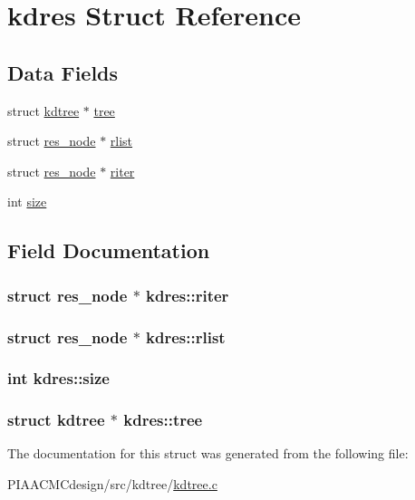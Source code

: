 \hypertarget{structkdres}{\section{kdres Struct Reference}
\label{structkdres}
}
\subsection*{Data Fields}
\begin{DoxyCompactItemize}
\item 
struct \hyperlink{structkdtree}{kdtree} $\ast$ \hyperlink{structkdres_acbd98d812368120a01c48ed4b41283db}{tree}
\item 
struct \hyperlink{structres__node}{res\+\_\+node} $\ast$ \hyperlink{structkdres_aa63f751354438c171111f9194db886d2}{rlist}
\item 
struct \hyperlink{structres__node}{res\+\_\+node} $\ast$ \hyperlink{structkdres_a5ea11c977a467694481b4c0fbb5befa1}{riter}
\item 
int \hyperlink{structkdres_a7ac4f6162e557c880476f7ca024ce946}{size}
\end{DoxyCompactItemize}


\subsection{Field Documentation}
\hypertarget{structkdres_a5ea11c977a467694481b4c0fbb5befa1}{
\subsubsection[{riter}]{\setlength{\rightskip}{0pt plus 5cm}struct {\bf res\+\_\+node} $\ast$ kdres\+::riter}}\label{structkdres_a5ea11c977a467694481b4c0fbb5befa1}
\hypertarget{structkdres_aa63f751354438c171111f9194db886d2}{
\subsubsection[{rlist}]{\setlength{\rightskip}{0pt plus 5cm}struct {\bf res\+\_\+node} $\ast$ kdres\+::rlist}}\label{structkdres_aa63f751354438c171111f9194db886d2}
\hypertarget{structkdres_a7ac4f6162e557c880476f7ca024ce946}{
\subsubsection[{size}]{\setlength{\rightskip}{0pt plus 5cm}int kdres\+::size}}\label{structkdres_a7ac4f6162e557c880476f7ca024ce946}
\hypertarget{structkdres_acbd98d812368120a01c48ed4b41283db}{
\subsubsection[{tree}]{\setlength{\rightskip}{0pt plus 5cm}struct {\bf kdtree} $\ast$ kdres\+::tree}}\label{structkdres_acbd98d812368120a01c48ed4b41283db}


The documentation for this struct was generated from the following file\+:\begin{DoxyCompactItemize}
\item 
P\+I\+A\+A\+C\+M\+Cdesign/src/kdtree/\hyperlink{PIAACMCdesign_2src_2kdtree_2kdtree_8c}{kdtree.\+c}\end{DoxyCompactItemize}

